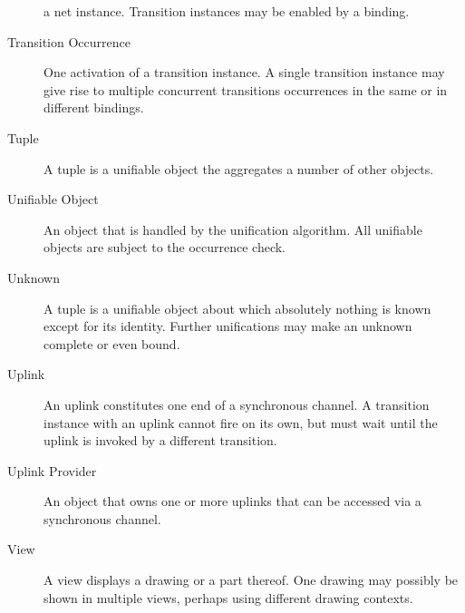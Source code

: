 \begin{description}
  a \see net instance. Transition instances may be \see enabled
  by a \see binding.
\item[Transition Occurrence] One activation of a \see transition
  instance. A single \see transition
  instance may give rise to multiple concurrent transitions
  occurrences in the same or in different \see bindings.
\item[Tuple] A tuple is a \see unifiable object the aggregates a number
  of other objects.
\item[Unifiable Object] An object that is handled by the unification
  algorithm. All unifiable objects are subject to the \see
  occurrence check.
\item[Unknown] A tuple is a \see unifiable object about which 
  absolutely nothing is known except for its identity.
  Further unifications may make an unknown complete or even bound.
\item[Uplink] An uplink constitutes one end of a synchronous channel.
  A \see transition instance with an uplink cannot 
  \see fire on its own, but must wait until the uplink is
  invoked by a different transition.
\item[Uplink Provider] An object that owns one or more \see uplinks
  that can be accessed via a \see synchronous channel.
\item[View] A view displays a \see drawing or a part thereof.
  One \see drawing may possibly be shown in multiple views,
  perhaps using different \see drawing contexts.
\end{description}
